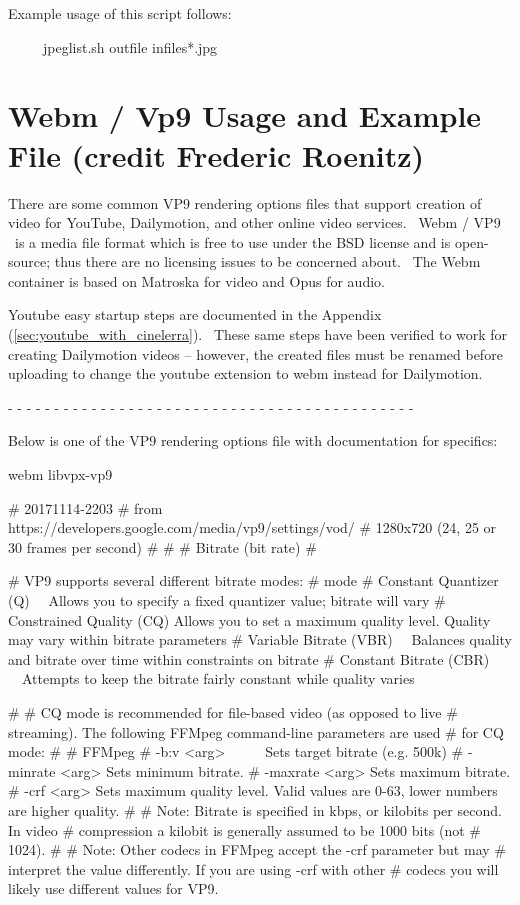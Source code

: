 Example usage of this script follows:
\medskip

\ \ \ \ \ jpeglist.sh outfile infiles*.jpg
\medskip

\section{Webm / Vp9 Usage and Example File (credit Frederic Roenitz)}
\label{sec:Webm / Vp9 Usage and Example File}

There are some common VP9 rendering options files that support creation of video for YouTube, Dailymotion, and other online video services. \ Webm / VP9 \ is a media file format which is free to use under the BSD license and is open-source; thus there are no licensing issues to be concerned about. \ The Webm container is based on Matroska for video and Opus for audio.
\medskip

Youtube easy startup steps are documented in the Appendix (\ref{sec:youtube_with_cinelerra}). \ These same steps have been verified to work for creating Dailymotion videos -- however, the created files must be renamed before uploading to change the youtube extension to webm instead for Dailymotion.

{}- - - - - - - - - - - - - - - - - - - - - - - - - - - - - - - - - - - - - - - - - - - -
\medskip

Below is one of the VP9 rendering options file with documentation for specifics:
\medskip

webm libvpx-vp9
\medskip

\# 20171114-2203
\# from https://developers.google.com/media/vp9/settings/vod/
\# 1280x720 (24, 25 or 30 frames per second)
\#
\#
\# Bitrate (bit rate)
\#

\# VP9 supports several different bitrate modes:
\# mode 
\# Constant Quantizer (Q) \ \ Allows you to specify a fixed quantizer value; bitrate will vary
\# Constrained Quality (CQ) Allows you to set a maximum quality level. Quality may vary within bitrate parameters
\# Variable Bitrate (VBR) \ \ Balances quality and bitrate over time within constraints on bitrate
\# Constant Bitrate (CBR) \ \ Attempts to keep the bitrate fairly constant while quality varies

\#
\# CQ mode is recommended for file-based video (as opposed to live
\# streaming). The following FFMpeg command-line parameters are used
\# for CQ mode:
\#
\# FFMpeg 
\# -b:v {\textless}arg{\textgreater} \ \ \ \ \ Sets target bitrate (e.g. 500k)
\# -minrate {\textless}arg{\textgreater} Sets minimum bitrate.
\# -maxrate {\textless}arg{\textgreater} Sets maximum bitrate.
\# -crf {\textless}arg{\textgreater} Sets maximum quality level. Valid values are 0-63, lower numbers are higher quality.
\#
\# Note: Bitrate is specified in kbps, or kilobits per second. In video
\# compression a kilobit is generally assumed to be 1000 bits (not
\# 1024).
\#
\# Note: Other codecs in FFMpeg accept the -crf parameter but may
\# interpret the value differently. If you are using -crf with other
\# codecs you will likely use different values for VP9.

